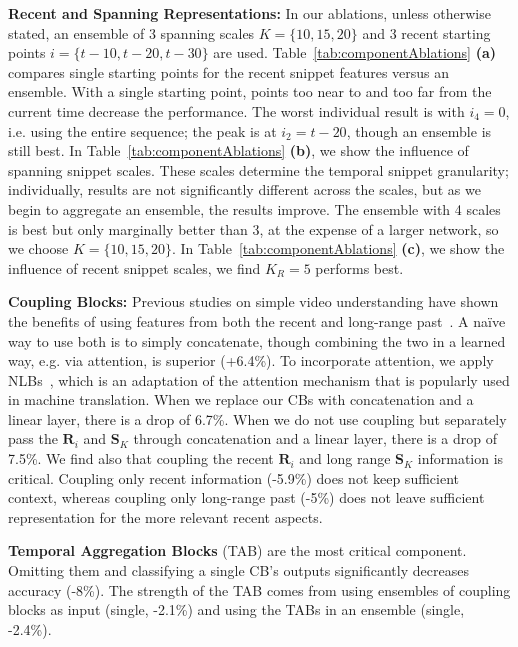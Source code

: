 \documentclass[runningheads]{llncs}
\makeatletter
\newcommand*{\eg}{e.g.\@\xspace}
\newcommand*{\ie}{i.e.\@\xspace}
\makeatother
\begin{document}
\textbf{Recent and Spanning Representations:}
In our ablations, unless otherwise stated, an ensemble of 3 spanning scales $K\!=\!\{10,15,20\}$ and 3 recent starting points $i\!=\!\{t\!-\!10,t\!-\!20,t\!-\!30\}$ are used.  Table~\ref{tab:componentAblations} \textbf{(a)} compares single starting points for the recent snippet features versus an ensemble. With a single starting point, points too near to and too far from the current time decrease the performance. The worst individual result is with $i_4 = 0$, \ie using the entire sequence; the peak is at $i_2 = t - 20$, though an ensemble is still best. In Table~\ref{tab:componentAblations} \textbf{(b)}, we show the influence of spanning snippet scales. These scales determine the temporal snippet granularity; individually, results are not significantly different across the scales, but as we begin to aggregate an ensemble, the results improve. The ensemble with 4 scales is best but only marginally better than 3, at the expense of a larger network, so we choose $K\!=\!\{10,15,20\}$. In Table~\ref{tab:componentAblations} \textbf{(c)}, we show the influence of recent snippet scales, we find $K_R = 5$ performs best.
 
\textbf{Coupling Blocks:} Previous studies on simple video understanding have shown the benefits of using features from both the recent and long-range past~\cite{li2017temporal,lfb2019}. A na\"ive way to use both is to simply concatenate, though combining the two in a learned way, \eg via attention, is superior (+6.4\%). To incorporate attention, we apply NLBs~\cite{wang2018non}, which is an adaptation of the attention mechanism that is popularly used in machine translation. When we replace our CBs with concatenation and a linear layer, there is a drop of 6.7\%. When we do not use coupling but separately pass the $\textbf{R}_i$ and $\textbf{S}_{K}$ through concatenation and a linear layer, there is a drop of 7.5\%. We find also that coupling the recent $\textbf{R}_i$ and long range $\textbf{S}_{K}$ information is critical. Coupling only recent information (-5.9\%) does not keep sufficient context, whereas coupling only long-range past (-5\%) does not leave sufficient representation for the more relevant recent aspects. 

\textbf{Temporal Aggregation Blocks} (TAB) are the most critical component. Omitting them and classifying a single CB's outputs significantly decreases accuracy (-8\%). The strength of the TAB comes from using ensembles of coupling blocks as input (single, -2.1\%) and using the TABs in an ensemble (single, -2.4\%). 
 
\end{document}
